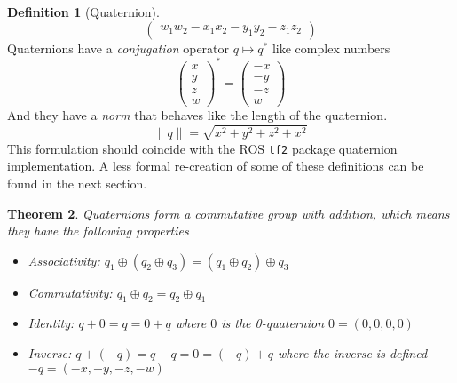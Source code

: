 \documentclass{amsart}
\newtheorem{theorem}{Theorem}[section]
\theoremstyle{definition}
\newtheorem{definition}[theorem]{Definition}
\theoremstyle{remark}
\numberwithin{equation}{section}
\begin{document}
\begin{definition}[Quaternion]
\begin{equation}
\begin{pmatrix}
      w_1w_2 - x_1x_2 - y_1y_2 - z_1z_2
    \end{pmatrix}
  \end{equation}
  Quaternions have a \emph{conjugation} operator $q\mapsto q^*$ like complex numbers
  \begin{equation}
    \begin{pmatrix}
      x \\
      y \\
      z \\
      w
    \end{pmatrix} ^ * =
    \begin{pmatrix}
      -x \\
      -y \\
      -z \\
      w
    \end{pmatrix}
  \end{equation}
  And they have a \emph{norm} that behaves like the length of the quaternion.
  \begin{equation}
    \|q\| = \sqrt{x^2 + y^2 + z^2 + x^2}
  \end{equation}
  This formulation should coincide with the ROS \texttt{tf2} package quaternion implementation. A less formal re-creation of some of these definitions can be found in the next section.
\end{definition}

\begin{theorem}
  Quaternions form a commutative group with addition, which means they have the following properties
  \begin{itemize}
  \item Associativity: $q_1\oplus(q_2\oplus q_3) = (q_1\oplus q_2) \oplus q_3$
  \item Commutativity: $q_1\oplus q_2 = q_2 \oplus q_1$
  \item Identity: $q+0=q=0+q$ where $0$ is the 0-quaternion $0=(0, 0, 0, 0)$
  \item Inverse: $q+(-q)=q-q=0=(-q)+q$ where the inverse is defined $-q=(-x, -y, -z, -w)$
  \end{itemize}  
\end{theorem}
\end{document}
